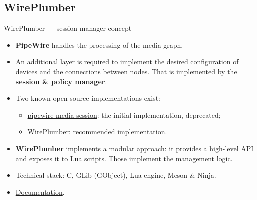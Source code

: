 \subsection{WirePlumber}



\begin{frame}{WirePlumber — session manager concept}
  \begin{itemize}

  \item \textbf{PipeWire} handles the processing of the media graph.

  \item An additional layer is required to implement the desired
    configuration of devices and the connections between nodes. That is
    implemented by the \textbf{session \& policy manager}.

  \item Two known open-source implementations exist:

    \begin{itemize}
    \item \href{https://gitlab.freedesktop.org/pipewire/media-session}{pipewire-media-session}:
      the initial implementation, deprecated;
    \item \href{https://pipewire.pages.freedesktop.org/wireplumber/}{WirePlumber}:
      recommended implementation.
    \end{itemize}

  \item \textbf{WirePlumber}
    implements a modular approach: it provides a high-level API and
    exposes it to \href{https://www.lua.org/}{Lua} scripts. Those
    implement the management logic.

  \item Technical stack: C, GLib (GObject), Lua engine, Meson \& Ninja.

  \item \href{https://pipewire.pages.freedesktop.org/wireplumber/}{Documentation}.

  \end{itemize}
\end{frame}



